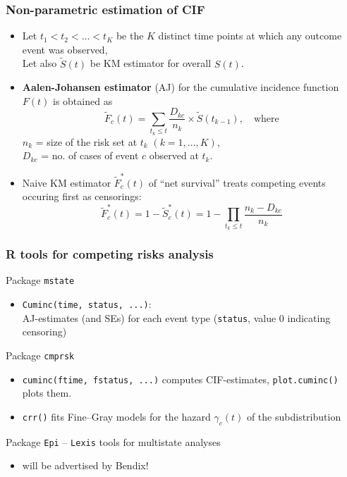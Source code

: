 \documentclass[handout,12pt]{beamer}
\begin{document}
\begin{frame}

\frametitle{Non-parametric estimation %
of CIF} 

\begin{itemize}
\item
Let $t_1 < t_2 < \dots < t_K$ be the $K$ distinct 
time points at which any outcome event was observed, \\ Let also
 $\widetilde{S}(t)$ be KM estimator for overall $S(t)$. 
\medskip
\item
\textbf{Aalen-Johansen estimator} (AJ) for the cumulative incidence function $F(t)$
is obtained as
$$ \widetilde{F}_c(t) 
   = \sum_{t_k \leq t} \frac{D_{kc}}{n_k} \times \widetilde{S}(t_{k-1}),
   \quad\text{where}
$$
$n_k$ = size of the risk set at $t_k$ $(k=1, \dots, K)$,
\\
$D_{kc}$ = no. of cases of event $c$ observed  at $t_k$.
\medskip
\item
Naive KM estimator $\widetilde{F}^*_c(t)$ of ``net survival'' treats  
competing events occuring first as censorings:  
$$  \widetilde{F}^*_c(t) = 1 - \widetilde{S}^*_c(t)
  = 1 - \prod_{t_k \leq t} \frac{n_k - D_{kc}}{n_k} $$
\end{itemize}

\end{frame}



\begin{frame}

\frametitle{R tools for competing risks analysis}

Package \texttt{mstate}
\begin{itemize}
\item \texttt{Cuminc(time, status, ...)}:  \\
 AJ-estimates (and SEs) for each event type 
  (\texttt{status}, value 0 indicating censoring)
\end{itemize}
Package \texttt{cmprsk}
\begin{itemize}
\item \texttt{cuminc(ftime, fstatus, ...)} 
  computes CIF-estimates,  %
   \texttt{plot.cuminc()} plots them. 
  \medskip
\item \texttt{crr()}
 fits Fine--Gray models for 
the hazard $\gamma_c(t)$ of the subdistribution
\end{itemize}   
Package \texttt{Epi} -- \texttt{Lexis} tools for multistate analyses
\begin{itemize}
\item  will be advertised by Bendix!
\end{itemize}

\end{frame}
\end{document}
